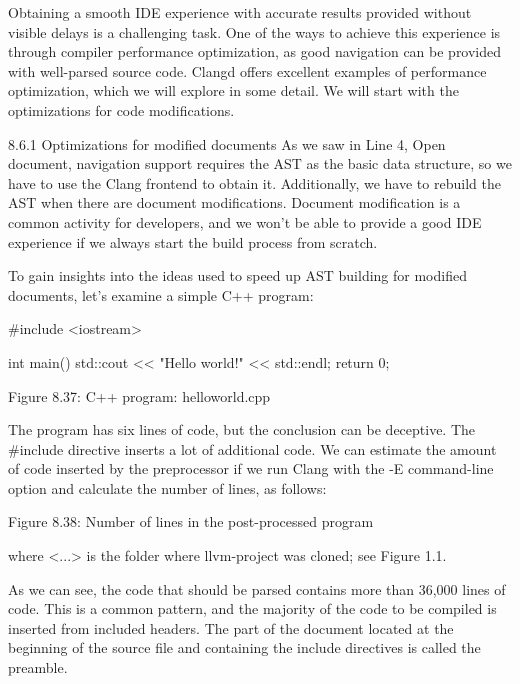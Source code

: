 Obtaining a smooth IDE experience with accurate results provided without visible delays is a challenging task. One of the ways to achieve this experience is through compiler performance optimization, as good navigation can be provided with well-parsed source code. Clangd offers excellent examples of performance optimization, which we will explore in some detail. We will start with the optimizations for code modifications.

8.6.1 Optimizations for modified documents
As we saw in Line 4, Open document, navigation support requires the AST as the basic data structure, so we have to use the Clang frontend to obtain it. Additionally, we have to rebuild the AST when there are document modifications. Document modification is a common activity for developers, and we won't be able to provide a good IDE experience if we always start the build process from scratch.


To gain insights into the ideas used to speed up AST building for modified documents, let's examine a simple C++ program:

\begin{cpp}
#include <iostream>

int main() {
  std::cout << "Hello world!" << std::endl;
  return 0;
}
\end{cpp}

\begin{center}
Figure 8.37: C++ program: helloworld.cpp
\end{center}

The program has six lines of code, but the conclusion can be deceptive. The \#include directive inserts a lot of additional code. We can estimate the amount of code inserted by the preprocessor if we run Clang with the -E command-line option and calculate the number of lines, as follows:


\begin{center}
Figure 8.38: Number of lines in the post-processed program
\end{center}

where <...> is the folder where llvm-project was cloned; see Figure 1.1.

As we can see, the code that should be parsed contains more than 36,000 lines of code. This is a common pattern, and the majority of the code to be compiled is inserted from included headers. The part of the document located at the beginning of the source file and containing the include directives is called the preamble.

